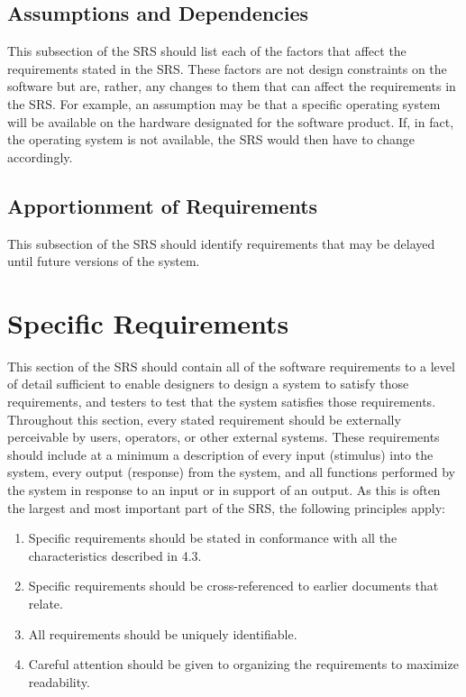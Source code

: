\documentclass[draftclsnofoot,onecolumn,10pt]{IEEEtran}
\begin{document}
\subsection{Assumptions and Dependencies}
This subsection of the SRS should list each of the factors that affect the
requirements stated in the SRS. These factors are not design constraints on the
software but are, rather, any changes to them that can affect the requirements
in the SRS. For example, an assumption may be that a specific operating system
will be available on the hardware designated for the software product. If, in
fact, the operating system is not available, the SRS would then have to change
accordingly.

\subsection{Apportionment of Requirements}
This subsection of the SRS should identify requirements that may be delayed
until future versions of the system.

\section{Specific Requirements}
This section of the SRS should contain all of the software requirements to a
level of detail sufficient to enable designers to design a system to satisfy
those requirements, and testers to test that the system satisfies those
requirements. Throughout this section, every stated requirement should be
externally perceivable by users, operators, or other external systems. These
requirements should include at a minimum a description of every input (stimulus)
into the system, every output (response) from the system, and all functions
performed by the system in response to an input or in support of an output. As
this is often the largest and most important part of the SRS, the following
principles apply:
\begin{enumerate}
	\item Specific requirements should be stated in conformance with all the
		characteristics described in 4.3.
	\item Specific requirements should be cross-referenced to earlier documents
		that relate.
	\item All requirements should be uniquely identifiable.
	\item Careful attention should be given to organizing the requirements to
		maximize readability.
\end{enumerate}
\end{document}
